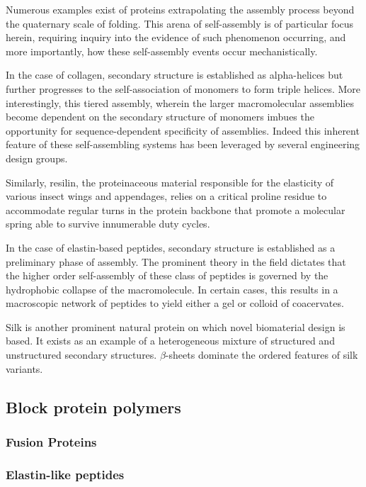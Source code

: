 \begin{refsection}
Numerous examples exist of proteins extrapolating the assembly process beyond
the quaternary scale of folding. This arena of self-assembly is of particular
focus herein, requiring inquiry into the evidence of such phenomenon occurring,
and more importantly, how these self-assembly events occur mechanistically.

In the case of collagen, secondary structure is established as alpha-helices but
further progresses to the self-association of monomers to form triple helices.
More interestingly, this tiered assembly, wherein the larger macromolecular
assemblies become dependent on the secondary structure of monomers imbues the
opportunity for sequence-dependent specificity of assemblies. Indeed this
inherent feature of these self-assembling systems has been leveraged by several
engineering design groups.\cite{}

Similarly, resilin, the proteinaceous material responsible for the elasticity of
various insect wings and appendages, relies on a critical proline residue to
accommodate regular turns in the protein backbone that promote a molecular
spring able to survive innumerable duty cycles.\cite{}

In the case of elastin-based peptides, secondary structure is established as a
preliminary phase of assembly. The prominent theory in the field dictates that
the higher order self-assembly of these class of peptides is governed by the
hydrophobic collapse of the macromolecule. In certain cases, this results in a
macroscopic network of peptides to yield either a gel or colloid of
coacervates.\cite{}

Silk is another prominent natural protein on which novel biomaterial design is
based. It exists as an example of a heterogeneous mixture of structured and
unstructured secondary structures.  $\beta$-sheets dominate the ordered features
of silk variants.

\subsection{Block protein polymers}

\subsubsection{Fusion Proteins}

\subsubsection{Elastin-like peptides}


\end{refsection}
